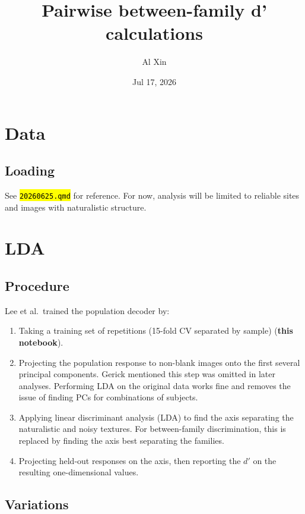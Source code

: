 \documentclass[
  10pt,
  letterpaper,
  DIV=11,
  numbers=noendperiod]{scrartcl}
\title{Pairwise between-family d' calculations}
\author{\small Al Xin}
\date{Jul 17, 2026}
\providecommand{\tightlist}{%
  \setlength{\itemsep}{0pt}\setlength{\parskip}{0pt}}
\let\OldTexttt\texttt
\renewcommand{\texttt}[1]{\OldTexttt{\hl{#1}}}
\begin{document}
\maketitle


\section{Data}\label{data}

\subsection{Loading}\label{loading}

See \texttt{20260625.qmd} for reference. For now, analysis will be
limited to reliable sites and images with naturalistic structure.

\section{LDA}\label{lda}

\subsection{Procedure}\label{procedure}

Lee et al.~trained the population decoder by:

\begin{enumerate}
\def\labelenumi{\arabic{enumi}.}
\tightlist
\item
  Taking a training set of repetitions (15-fold CV separated by sample)
  (\textbf{this notebook}).
\item
  Projecting the population response to non-blank images onto the first
  several principal components. Gerick mentioned this step was omitted
  in later analyses. Performing LDA on the original data works fine and
  removes the issue of finding PCs for combinations of subjects.
\item
  Applying linear discriminant analysis (LDA) to find the axis
  separating the naturalistic and noisy textures. For between-family
  discrimination, this is replaced by finding the axis best separating
  the families.
\item
  Projecting held-out responses on the axis, then reporting the \(d'\)
  on the resulting one-dimensional values.
\end{enumerate}

\subsection{Variations}\label{variations}
\end{document}
